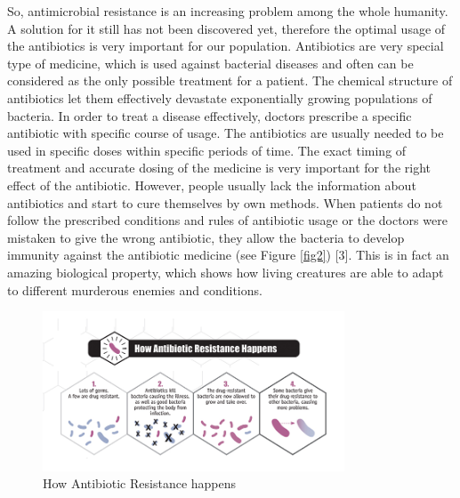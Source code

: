So, antimicrobial resistance is an increasing problem among the whole humanity. A solution for it still has not been discovered yet, therefore the optimal usage of the antibiotics is very important for our population. Antibiotics are very special type of medicine, which is used against bacterial diseases and often can be considered as the only possible treatment for a patient. The chemical structure of antibiotics let them effectively devastate exponentially growing populations of bacteria. In order to treat a disease effectively, doctors prescribe a specific antibiotic with specific course of usage. The antibiotics are usually needed to be used in specific doses within specific periods of time. The exact timing of treatment and accurate dosing of the medicine is very important for the right effect of the antibiotic. However, people usually lack the information about antibiotics and start to cure themselves by own methods. When patients do not follow the prescribed conditions and rules of antibiotic usage or the doctors were mistaken to give the wrong antibiotic, they allow the bacteria to develop immunity against the antibiotic medicine (see Figure \ref{fig2}) [3]. This is in fact an amazing biological property, which shows how living creatures are able to adapt to different murderous enemies and conditions.

\begin{figure}[H]
  \centering
  \includegraphics[width=0.8\textwidth]{img/Fig3}
  \caption{How Antibiotic Resistance happens}
  \label{fig3}
\end{figure}

